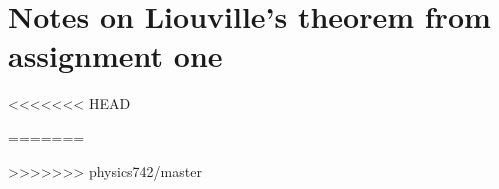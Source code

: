 \section{Notes on Liouville's theorem from assignment one}
<<<<<<< HEAD

=======






>>>>>>> physics742/master

